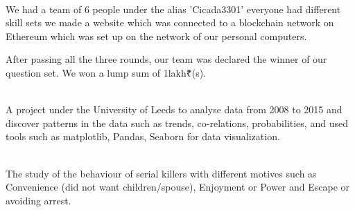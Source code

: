 \documentclass[a4paper]{MagicalCV}
\begin{document}
\begin{minipage}[t]{0.66\textwidth}

 \\
\vspace{\topsep} %
\begin{tightemize}
\item We had a team of 6 people under the alias 'Cicada3301' everyone had different skill sets we made a website which was connected to a blockchain network on Ethereum which was set up on the network of our personal computers. 
\item  After passing all the three rounds, our team was declared the winner of our question set. We won a lump sum of 1lakh₹(s).  
\end{tightemize}
\sectionsep


 \\
 A project under the University of Leeds to analyse data from 2008 to 2015 and discover patterns in the data such as trends, co-relations, probabilities, and used tools such as matplotlib, Pandas, Seaborn for data visualization.
\sectionsep

 \\
The study of the behaviour of serial killers with different motives such as Convenience (did not want children/spouse), Enjoyment or Power and Escape or avoiding arrest.
\end{minipage} 
\end{document}
